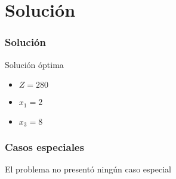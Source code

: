 \documentclass{beamer}
\begin{document}
\section{Solución} 
\begin{frame} 
\frametitle{Solución} 
\begin{exampleblock}{Solución óptima} 
\begin{itemize} 
\item $Z = 280$ 
\item $x_{1} = 2$ 
\item $x_{3} = 8$ 
\end{itemize} 
\end{exampleblock} 
\end{frame} 


\begin{frame} 
\frametitle{Casos especiales} 
El problema no presentó ningún caso especial 
\end{frame} 
\end{document}
